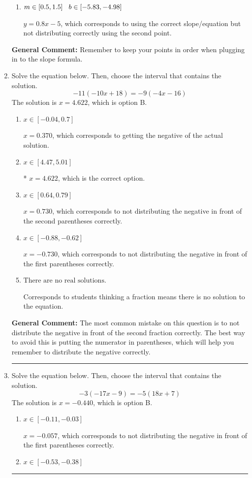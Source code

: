 \documentclass{extbook}[14pt]
\newcommand{\litem}[1]{\item #1

\rule{\textwidth}{0.4pt}}
\begin{document}
\begin{enumerate}
{\begin{enumerate}[label=\Alph*.]
* $y = 0.8x -4.6$, which is the correct option.
\item \( m \in [0.5, 1.5] \hspace*{3mm} b \in [-5.83, -4.98] \)

 $y = 0.8x -5$, which corresponds to using the correct slope/equation but not distributing correctly using the second point.
\end{enumerate}

\textbf{General Comment:} Remember to keep your points in order when plugging in to the slope formula.
}
\litem{
Solve the equation below. Then, choose the interval that contains the solution.
\[ -11(-10x + 18) = -9(-4x -16) \]
The solution is \( x = 4.622 \), which is option B.\begin{enumerate}[label=\Alph*.]
\item \( x \in [-0.04, 0.7] \)

$x = 0.370$, which corresponds to getting the negative of the actual solution.
\item \( x \in [4.47, 5.01] \)

* $x = 4.622$, which is the correct option.
\item \( x \in [0.64, 0.79] \)

$x = 0.730$, which corresponds to not distributing the negative in front of the second parentheses correctly.
\item \( x \in [-0.88, -0.62] \)

$x = -0.730$, which corresponds to not distributing the negative in front of the first parentheses correctly.
\item \( \text{There are no real solutions.} \)

Corresponds to students thinking a fraction means there is no solution to the equation.
\end{enumerate}

\textbf{General Comment:} The most common mistake on this question is to not distribute the negative in front of the second fraction correctly. The best way to avoid this is putting the numerator in parentheses, which will help you remember to distribute the negative correctly.
}
\litem{
Solve the equation below. Then, choose the interval that contains the solution.
\[ -3(-17x -9) = -5(18x + 7) \]
The solution is \( x = -0.440 \), which is option B.\begin{enumerate}[label=\Alph*.]
\item \( x \in [-0.11, -0.03] \)

$x = -0.057$, which corresponds to not distributing the negative in front of the first parentheses correctly.
\item \( x \in [-0.53, -0.38] \)


\end{enumerate}}
\end{enumerate}
\end{document}
